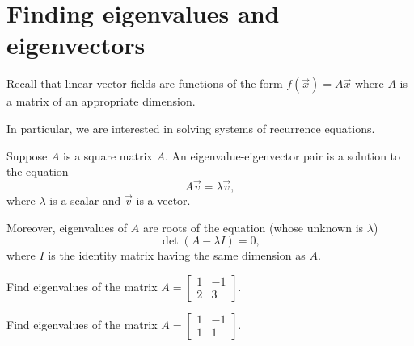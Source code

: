 \documentclass[../main.tex]{subfiles}
\begin{document}
 \section{Finding eigenvalues and eigenvectors}

Recall that linear vector fields are functions of the form \(f(\vec{x}) = A\vec{x}\) where \(A\) is a matrix of an appropriate dimension.  

In particular, we are interested in solving systems of recurrence equations. 

\begin{definition}
  Suppose \(A\) is a square matrix \(A\). An eigenvalue-eigenvector pair is a solution to the equation
  \[
    A \vec{v} = \lambda \vec{v},
  \]
  where \(\lambda\) is a scalar and \(\vec{v}\) is a  vector. 

  Moreover, eigenvalues of \(A\) are roots of the equation (whose unknown is \(\lambda\))
  \[
    \det( A - \lambda I ) = 0,
  \]
  where \(I\) is the identity matrix having the same dimension as \(A\).
\end{definition}

\begin{example}
  Find eigenvalues of the matrix 
  \(
    A = \begin{bmatrix}
      1 & -1 \\
      2 & 3
    \end{bmatrix}
  \).
\end{example}

\begin{example}
  Find eigenvalues of the matrix 
  \(
    A = \begin{bmatrix}
      1 & -1 \\
      1 & 1
    \end{bmatrix}
  \).
\end{example}
\end{document}
